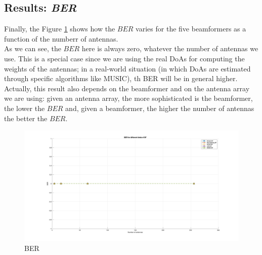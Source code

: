 \subsection{Results: \textit{BER}}

Finally, the Figure \ref{fig:BER} shows how the $BER$ varies for the five beamformers as a function of the numberr of antennas.\\
As we can see, the $BER$ here is always zero, whatever the number of antennas we use. This is a special case since we are using 
the real DoAs for computing the weights of the antennas; in a real-world situation (in which DoAs are estimated through 
specific algorithms like MUSIC), th BER will be in general higher.\\ 
Actually, this result also depends on the beamformer and on the antenna array we are using: given an antenna array,  the more 
sophisticated is the beamformer, the lower the $BER$ and, given a beamformer, the higher the number of antennas the better the
$BER$.

\begin{figure}[ht]
    \includegraphics[width=\linewidth]{BER.jpg}
    \caption{BER}
    \label{fig:BER}
\end{figure}